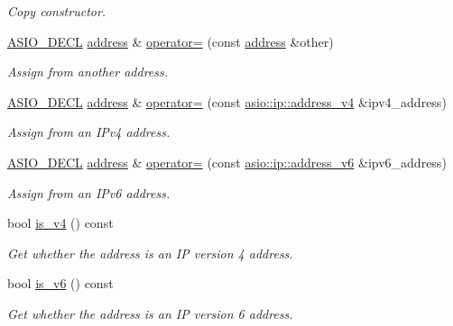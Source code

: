 \begin{DoxyCompactItemize}
\begin{DoxyCompactList}\small\item\em Copy constructor. \end{DoxyCompactList}\item 
\hyperlink{config_8hpp_ab54d01ea04afeb9a8b39cfac467656b7}{A\+S\+I\+O\+\_\+\+D\+E\+C\+L} \hyperlink{classasio_1_1ip_1_1address}{address} \& \hyperlink{classasio_1_1ip_1_1address_a04a63c3e675ff3885fa0aaf93da52157}{operator=} (const \hyperlink{classasio_1_1ip_1_1address}{address} \&other)
\begin{DoxyCompactList}\small\item\em Assign from another address. \end{DoxyCompactList}\item 
\hyperlink{config_8hpp_ab54d01ea04afeb9a8b39cfac467656b7}{A\+S\+I\+O\+\_\+\+D\+E\+C\+L} \hyperlink{classasio_1_1ip_1_1address}{address} \& \hyperlink{classasio_1_1ip_1_1address_a6a897cecfe1ec552425af15f0567325e}{operator=} (const \hyperlink{classasio_1_1ip_1_1address__v4}{asio\+::ip\+::address\+\_\+v4} \&ipv4\+\_\+address)
\begin{DoxyCompactList}\small\item\em Assign from an I\+Pv4 address. \end{DoxyCompactList}\item 
\hyperlink{config_8hpp_ab54d01ea04afeb9a8b39cfac467656b7}{A\+S\+I\+O\+\_\+\+D\+E\+C\+L} \hyperlink{classasio_1_1ip_1_1address}{address} \& \hyperlink{classasio_1_1ip_1_1address_a417bf28e865609597868f75ead881ddd}{operator=} (const \hyperlink{classasio_1_1ip_1_1address__v6}{asio\+::ip\+::address\+\_\+v6} \&ipv6\+\_\+address)
\begin{DoxyCompactList}\small\item\em Assign from an I\+Pv6 address. \end{DoxyCompactList}\item 
bool \hyperlink{classasio_1_1ip_1_1address_ac3b42aba14b8d4e0d033ec6b264e0a35}{is\+\_\+v4} () const 
\begin{DoxyCompactList}\small\item\em Get whether the address is an I\+P version 4 address. \end{DoxyCompactList}\item 
bool \hyperlink{classasio_1_1ip_1_1address_ae9ca58d96b23243a71bbab0f2acdd95d}{is\+\_\+v6} () const 
\begin{DoxyCompactList}\small\item\em Get whether the address is an I\+P version 6 address. \end{DoxyCompactList}\item 

\end{DoxyCompactItemize}
